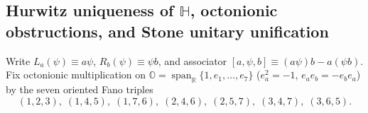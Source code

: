 \documentclass[aps,prd,onecolumn,tightenlines,nofootinbib,notitlepage,10pt,floatfix]{revtex4-2}
\theoremstyle{indentedtheorem}
\begin{document}
\subsection{Hurwitz uniqueness of \texorpdfstring{$\mathbb{H}$}{H}, octonionic obstructions, and Stone unitary unification}
\label{sec:constraints}

Write $L_a(\psi)\equiv a\psi$, $R_b(\psi)\equiv\psi b$, and associator $[a,\psi,b]\equiv(a\psi)b-a(\psi b)$. Fix octonionic multiplication on $\mathbb{O}=\operatorname{span}_{\mathbb{R}}\{1,e_1,\dots,e_7\}$ ($e_a^2=-1$, $e_a e_b=-e_b e_a$) by the seven oriented Fano triples
\begin{equation}
    (1,2,3),\;(1,4,5),\;(1,7,6),\;(2,4,6),\;(2,5,7),\;(3,4,7),\;(3,6,5) .
    \label{eq:fano_triples}
\end{equation}
\end{document}
